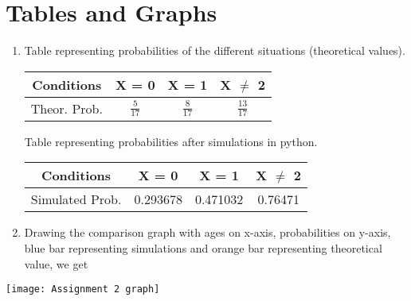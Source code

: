 \documentclass[journal,12pt,twocolumn]{IEEEtran}
\begin{document}
\section* {Tables and Graphs} 
\begin{enumerate}
\item Table representing probabilities of the different situations (theoretical values).

\begin{center}
    \begin{tabular}{|c|c|c|c|}
    \hline
    {Conditions} & X = 0    & X = 1    & X $\ne$ 2    \\
    \hline
    {Theor. Prob.} & $\frac{5}{17}$ & $\frac{8}{17}$ & $\frac{13}{17}$ \\
    \hline
    \end{tabular}
\end{center}

Table representing probabilities after simulations in python.
\begin{center}
    \begin{tabular}{|c|c|c|c|}
    \hline
    {Conditions} & X = 0    & X = 1    & X $\ne$ 2    \\
    \hline
    {Simulated Prob.} & 0.293678 & 0.471032 & 0.76471 \\
    \hline
    \end{tabular}
\end{center}

\item Drawing the comparison graph with ages on x-axis, probabilities on y-axis, blue bar representing simulations and orange bar representing theoretical value, we get
\end{enumerate}
\texttt{[image: Assignment 2 graph]}
\end{document}
